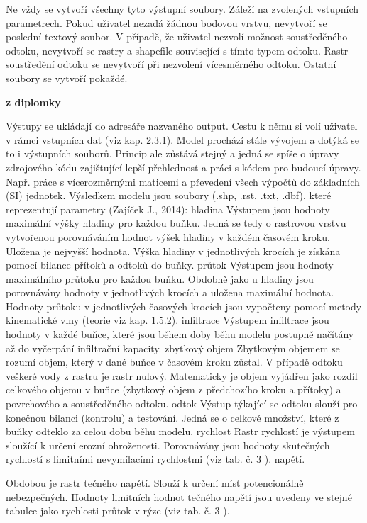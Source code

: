 \par Ne vždy se vytvoří všechny tyto výstupní soubory. Záleží na zvolených vstupních parametrech. Pokud uživatel nezadá žádnou bodovou vrstvu, nevytvoří se poslední textový soubor. 
V případě, že uživatel nezvolí možnost soustředěného odtoku, nevytvoří se rastry a shapefile související s tímto typem odtoku. Rastr soustředění odtoku se nevytvoří při nezvolení vícesměrného odtoku. 
Ostatní soubory se vytvoří pokaždé.  

\textbf{ z diplomky}

Výstupy se ukládají do adresáře nazvaného output. Cestu k němu si volí uživatel v rámci vstupních dat (viz kap. 2.3.1). Model prochází stále vývojem a dotýká se to i výstupních souborů. Princip ale zůstává stejný a jedná se spíše o úpravy zdrojového kódu zajištující lepší přehlednost a práci s kódem pro budoucí úpravy. Např. práce s vícerozměrnými maticemi a převedení všech výpočtů do základních (SI) jednotek. 
Výsledkem modelu jsou soubory (.shp, .rst, .txt, .dbf), které reprezentují parametry (Zajíček J., 2014):
hladina
Výstupem jsou hodnoty maximální výšky hladiny pro každou buňku. Jedná se tedy o rastrovou vrstvu vytvořenou porovnáváním hodnot výšek hladiny v každém časovém kroku. Uložena je nejvyšší hodnota. Výška hladiny v jednotlivých krocích je získána pomocí bilance přítoků a odtoků do buňky.  
průtok
Výstupem jsou hodnoty maximálního průtoku pro každou buňku. Obdobně jako u hladiny jsou porovnávány hodnoty v jednotlivých krocích a uložena maximální hodnota. Hodnoty průtoku v jednotlivých časových krocích jsou vypočteny pomocí metody kinematické vlny (teorie viz kap. 1.5.2).
infiltrace
Výstupem infiltrace jsou hodnoty v každé buňce, které jsou během doby běhu modelu postupně načítány až do vyčerpání infiltrační kapacity.
zbytkový objem
Zbytkovým objemem se rozumí objem, který v dané buňce v časovém kroku zůstal. V případě odtoku veškeré vody z rastru je rastr nulový. Matematicky je objem vyjádřen jako rozdíl celkového objemu v buňce (zbytkový objem z předchozího kroku a přítoky) a povrchového a soustředěného odtoku.
odtok
Výstup týkající se odtoku slouží pro konečnou bilanci (kontrolu) a testování. Jedná se o celkové množství, které z buňky odteklo za celou dobu běhu modelu. 
rychlost
Rastr rychlostí je výstupem sloužící k určení erozní ohroženosti. Porovnávány jsou hodnoty skutečných rychlostí s limitními nevymílacími rychlostmi (viz tab. č. 3 ).
napětí. 

Obdobou je rastr tečného napětí. Slouží k určení míst potencionálně nebezpečných. Hodnoty limitních hodnot tečného napětí jsou uvedeny ve stejné tabulce jako rychlosti průtok v rýze (viz tab. č. 3 ).


